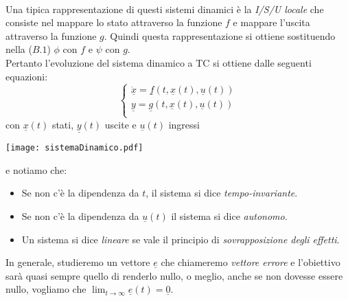 \paragraph{}
Una tipica rappresentazione di questi sistemi dinamici è la \emph{I/S/U locale} che consiste nel mappare lo stato attraverso la funzione $f$ e mappare l'uscita attraverso la funzione $g$. Quindi questa rappresentazione si ottiene sostituendo nella ($B.1$) $\phi$ con $f$ e $\psi$ con $g$.\\ 
Pertanto l'evoluzione del sistema dinamico a TC si ottiene dalle seguenti equazioni:
\begin{equation}
	\begin{cases}
		\underline{\dot{x}} = \underline{f}(t, \underline{x}(t), \underline{u}(t)) \\
		\underline{y} = \underline{g}(t, \underline{x}(t), \underline{u}(t)) \\
	\end{cases}
\end{equation}
con $\underline{x}(t)$ stati, $\underline{y}(t)$ uscite e $\underline{u}(t)$ ingressi
\begin{center}
	\texttt{[image: sistemaDinamico.pdf]}
\end{center}
e notiamo che:
\begin{itemize}
	\item Se non c'è la dipendenza da $t$, il sistema si dice \emph{tempo-invariante}.
	\item Se non c'è la dipendenza da $\underline{u}(t)$ il sistema si dice \emph{autonomo}.
	\item Un sistema si dice \emph{lineare} se vale il principio di \emph{sovrapposizione degli effetti}.
\end{itemize}
In generale, studieremo un vettore $\underline{e}$ che chiameremo \emph{vettore errore} e l'obiettivo sarà quasi sempre quello di renderlo nullo, o meglio, anche se non dovesse essere nullo, vogliamo che $ \lim_{t \to \infty} \underline{e}(t) = \underline{0}$.

